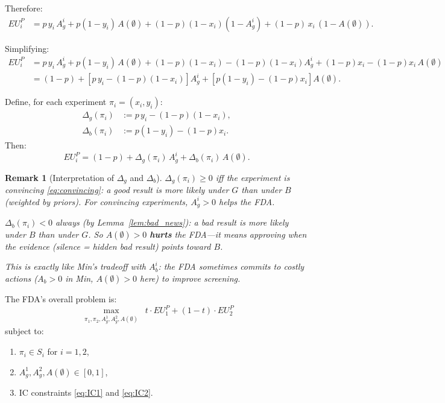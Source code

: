 \documentclass[12pt,a4paper]{article}
\newtheorem{remark}{Remark}
\begin{document}
Therefore:
\begin{equation}\label{eq:EU_P}
\begin{aligned}
  EU^P_i
  &= p \, y_i \, A_g^i
     + p(1-y_i) \, A(\emptyset)
     + (1-p)(1-x_i)(1 - A_g^i)
     + (1-p) \, x_i \, (1 - A(\emptyset)).
\end{aligned}
\end{equation}

Simplifying:
\begin{equation}\label{eq:EU_P_simple}
\begin{aligned}
  EU^P_i
  &= p \, y_i \, A_g^i
     + p(1-y_i) \, A(\emptyset)
     + (1-p)(1-x_i) - (1-p)(1-x_i) A_g^i
     + (1-p) x_i - (1-p) x_i \, A(\emptyset) \\
  &= (1-p) + \left[p \, y_i - (1-p)(1-x_i)\right] A_g^i
     + \left[p(1-y_i) - (1-p) x_i\right] A(\emptyset).
\end{aligned}
\end{equation}

Define, for each experiment $\pi_i = (x_i, y_i)$:
\begin{align}
  \Delta_g(\pi_i)
    &:= p \, y_i - (1-p)(1-x_i),
    \label{eq:delta_g_def} \\
  \Delta_b(\pi_i)
    &:= p(1-y_i) - (1-p) x_i.
    \label{eq:delta_b_def}
\end{align}
Then:
\begin{equation}\label{eq:EU_P_compact}
  EU^P_i = (1-p) + \Delta_g(\pi_i) \, A_g^i
           + \Delta_b(\pi_i) \, A(\emptyset).
\end{equation}

\begin{remark}[Interpretation of $\Delta_g$ and $\Delta_b$]
$\Delta_g(\pi_i) \geq 0$ iff the experiment is convincing
\eqref{eq:convincing}: a good result is more likely under $G$
than under $B$ (weighted by priors). For convincing experiments,
$A_g^i > 0$ helps the FDA.

$\Delta_b(\pi_i) < 0$ always (by Lemma~\ref{lem:bad_news}):
a bad result is more likely under $B$ than under $G$.
So $A(\emptyset) > 0$ \textbf{hurts} the FDA---it means
approving when the evidence (silence = hidden bad result)
points toward $B$.

This is exactly like Min's tradeoff with $A_b^i$: the FDA
sometimes commits to costly actions ($A_b > 0$ in Min,
$A(\emptyset) > 0$ here) to improve screening.
\end{remark}

The FDA's overall problem is:
\begin{equation}\label{eq:fda_max}
  \max_{\substack{\pi_1, \pi_2, A_g^1, A_g^2, A(\emptyset)}}
  \; t \cdot EU^P_1 + (1-t) \cdot EU^P_2
\end{equation}
subject to:
\begin{enumerate}
  \item $\pi_i \in S_i$ for $i = 1, 2$,
  \item $A_g^1, A_g^2, A(\emptyset) \in [0, 1]$,
  \item IC constraints \eqref{eq:IC1} and \eqref{eq:IC2}.
\end{enumerate}
\end{document}

